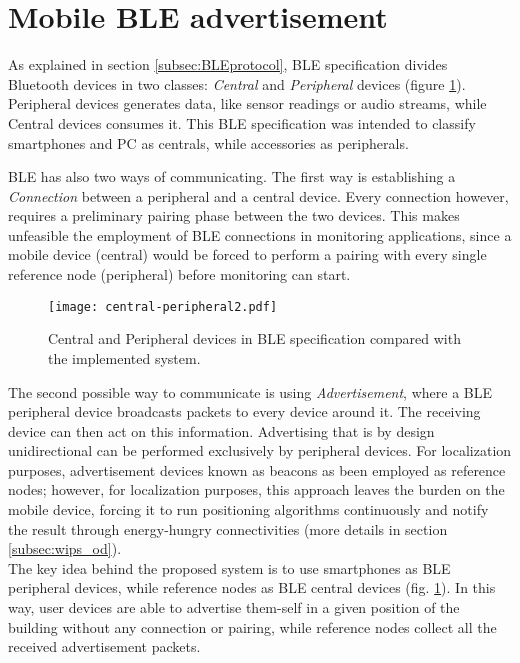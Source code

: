 \section{Mobile BLE advertisement}
\label{sec:advertisement}
As explained in section \ref{subsec:BLEprotocol}, BLE specification divides Bluetooth devices in two classes: \emph{Central} and \emph{Peripheral} devices (figure \ref{fig:cent-per}). Peripheral devices generates data, like sensor readings or audio streams, while Central devices consumes it. This BLE specification was intended to classify smartphones and PC as centrals, while accessories as peripherals.

BLE has also two ways of communicating. The first way is establishing a \emph{Connection} between a peripheral and a central device. Every connection however, requires a preliminary pairing phase between the two devices. This makes unfeasible the employment of BLE connections in monitoring applications, since a mobile device (central) would be forced to perform a pairing with every single reference node (peripheral) before monitoring can start.

\begin{figure}[h!tb]
\centering
\texttt{[image: central-peripheral2.pdf]}
\caption[Central and Peripheral devices in BLE specification and the implemented system.]{Central and Peripheral devices in BLE specification compared with the implemented system.}
\label{fig:cent-per}
\end{figure}

The second possible way to communicate is using \emph{Advertisement}, where a BLE peripheral device broadcasts packets to every device around it. The receiving device can then act on this information.
Advertising that is by design unidirectional can be performed exclusively by peripheral devices.
For localization purposes, advertisement devices known as beacons as been employed as reference nodes; however, for localization purposes, this approach leaves the burden on the mobile device, forcing it to run positioning algorithms continuously and notify the result through energy-hungry connectivities (more details in section \ref{subsec:wips_od}).\\
The key idea behind the proposed system is to use smartphones as BLE peripheral devices, while reference nodes as BLE central devices (fig. \ref{fig:cent-per}). In this way, user devices are able to advertise them-self in a given position of the building without any connection or pairing, while reference nodes collect all the received advertisement packets.

